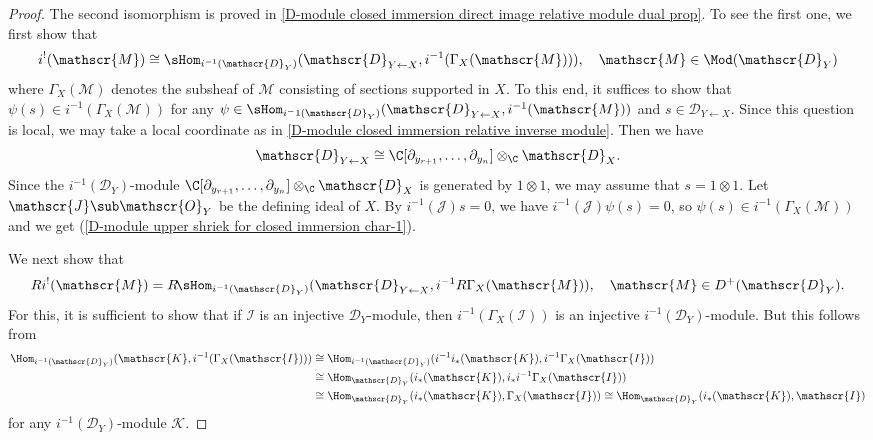 \begin{proof}
The second isomorphism is proved in \cref{D-module closed immersion direct image relative module dual prop}. To see the first one, we first show that
\begin{equation}\label{D-module upper shriek for closed immersion char-1}
i^!(\mathscr{M})\cong\sHom_{i^{-1}(\mathscr{D}_Y)}(\mathscr{D}_{Y\leftarrow X},i^{-1}(\Gamma_X(\mathscr{M}))),\quad \mathscr{M}\in\Mod(\mathscr{D}_Y)
\end{equation}
where $\Gamma_X(\mathscr{M})$ denotes the subsheaf of $\mathscr{M}$ consisting of sections supported in $X$. To this end, it suffices to show that $\psi(s)\in i^{-1}(\Gamma_X(\mathscr{M}))$ for any $\psi\in\sHom_{i{^-1}(\mathscr{D}_Y)}(\mathscr{D}_{Y\leftarrow X},i^{-1}(\mathscr{M}))$ and $s\in\mathscr{D}_{Y\leftarrow X}$. Since this question is local, we may take a local coordinate as in \cref{D-module closed immersion relative inverse module}. Then we have
\[\mathscr{D}_{Y\leftarrow X}\cong\C[\partial_{y_{r+1}},\dots,\partial_{y_n}]\otimes_\C\mathscr{D}_X.\]
Since the $i^{-1}(\mathscr{D}_Y)$-module $\C[\partial_{y_{r+1}},\dots,\partial_{y_n}]\otimes_\C\mathscr{D}_X$ is generated by $1\otimes 1$, we may assume that $s=1\otimes 1$. Let $\mathscr{J}\sub\mathscr{O}_Y$ be the defining ideal of $X$. By $i^{-1}(\mathscr{J})s=0$, we have $i^{-1}(\mathscr{J})\psi(s)=0$, so $\psi(s)\in i^{-1}(\Gamma_X(\mathscr{M}))$ and we get (\ref{D-module upper shriek for closed immersion char-1}).\par
We next show that
\begin{equation}
Ri^!(\mathscr{M})=R\!\sHom_{i^{-1}(\mathscr{D}_Y)}(\mathscr{D}_{Y\leftarrow X},i^{-1}R\Gamma_X(\mathscr{M})),\quad \mathscr{M}\in D^+(\mathscr{D}_Y).
\end{equation}
For this, it is sufficient to show that if $\mathscr{I}$ is an injective $\mathscr{D}_Y$-module, then $i^{-1}(\Gamma_X(\mathscr{I}))$ is an injective $i^{-1}(\mathscr{D}_Y)$-module. But this follows from
\begin{align*}
\Hom_{i^{-1}(\mathscr{D}_Y)}(\mathscr{K},i^{-1}(\Gamma_X(\mathscr{I})))&\cong \Hom_{i^{-1}(\mathscr{D}_Y)}(i^{-1}i_*(\mathscr{K}),i^{-1}\Gamma_X(\mathscr{I}))\\
&\cong \Hom_{\mathscr{D}_Y}(i_*(\mathscr{K}),i_*i^{-1}\Gamma_X(\mathscr{I}))\\
&\cong \Hom_{\mathscr{D}_Y}(i_*(\mathscr{K}),\Gamma_X(\mathscr{I}))\cong\Hom_{\mathscr{D}_Y}(i_*(\mathscr{K}),\mathscr{I})
\end{align*}
for any $i^{-1}(\mathscr{D}_Y)$-module $\mathscr{K}$.\par

\end{proof}
